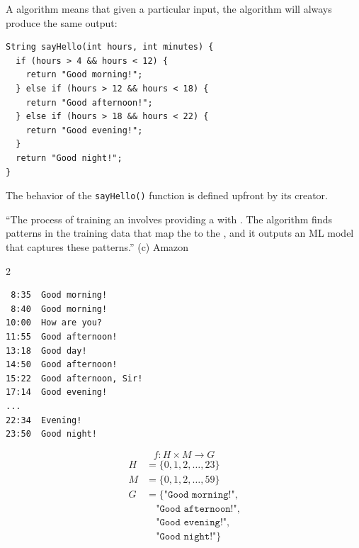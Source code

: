 \documentclass{article}
\begin{document}

\pptToc



A  algorithm means that given a particular input, the algorithm will always produce the same output:

{\scriptsize\begin{verbatim}
String sayHello(int hours, int minutes) {
  if (hours > 4 && hours < 12) {
    return "Good morning!";
  } else if (hours > 12 && hours < 18) {
    return "Good afternoon!";
  } else if (hours > 18 && hours < 22) {
    return "Good evening!";
  }
  return "Good night!";
}
\end{verbatim}
}

The behavior of the \texttt{sayHello()} function is defined upfront by its creator.

\plush{}


``The process of training an  involves providing a  with . The algorithm finds patterns in the training data that map the  to the , and it outputs an ML model that captures these patterns.'' (c) Amazon

\begin{multicols}{2}
{\scriptsize\begin{verbatim}
 8:35  Good morning!
 8:40  Good morning!
10:00  How are you?
11:55  Good afternoon!
13:18  Good day!
14:50  Good afternoon!
15:22  Good afternoon, Sir!
17:14  Good evening!
...
22:34  Evening!
23:50  Good night!
\end{verbatim}
}
\par\columnbreak\par
\begin{equation*}
f : H \times M \to G
\end{equation*}
{\scriptsize\begin{equation*}
\begin{split}
H &= \{ 0, 1, 2, \dots, 23 \} \\
M &= \{ 0, 1, 2, \dots, 59 \} \\
G &= \{ \texttt{"Good morning!"}, \\
  & \quad\texttt{"Good afternoon!"}, \\
  & \quad\texttt{"Good evening!"}, \\
  & \quad\texttt{"Good night!"} \} \\
\end{split}
\end{equation*}}
\end{multicols}
\end{document}
